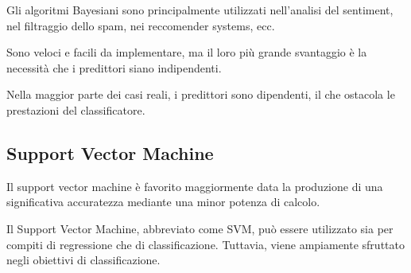 Gli algoritmi Bayesiani sono principalmente utilizzati nell'analisi del sentiment, nel filtraggio dello spam, nei reccomender systems, ecc. 

Sono veloci e facili da implementare, ma il loro più grande svantaggio è la necessità che i predittori siano indipendenti. 

Nella maggior parte dei casi reali, i predittori sono dipendenti, il che ostacola le prestazioni del classificatore.


\subsection{Support Vector Machine}
Il support vector machine è favorito maggiormente data la produzione di una significativa accuratezza mediante una minor potenza di calcolo. 

Il Support Vector Machine, abbreviato come SVM, può essere utilizzato sia per compiti di regressione che di classificazione. Tuttavia, viene ampiamente sfruttato negli obiettivi di classificazione.
